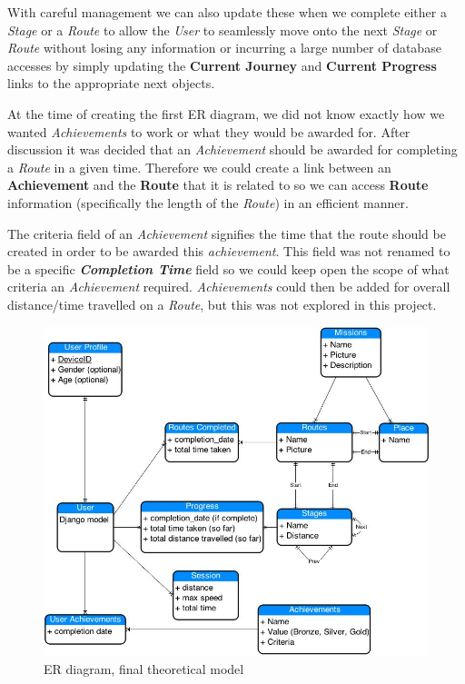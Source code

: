 With careful management we can also update these when we complete
either a \emph{Stage} or a \emph{Route} to allow the \emph{User} to
seamlessly move onto the next \emph{Stage} or \emph{Route} without
losing any information or incurring a large number of database
accesses by simply updating the \textbf{Current Journey} and
\textbf{Current Progress} links to the appropriate next objects. 

At the time of creating the first ER diagram, we did not know exactly
how we wanted \emph{Achievements} to work or what they would be
awarded for. After discussion it was decided that an
\emph{Achievement} should be awarded for completing a \emph{Route} in
a given time. Therefore we could create a link between an
\textbf{Achievement} and the \textbf{Route} that it is related to so
we can access \textbf{Route} information (specifically the length of the 
\emph{Route}) in an efficient manner. 

The criteria field of an \emph{Achievement} signifies the time that
the route should be created in order to be awarded this
\emph{achievement}. This field was not renamed to be a specific
\textbf{\textit{Completion Time}} field so we could keep open the
scope of what criteria an \emph{Achievement}
required. \emph{Achievements} could then be added for overall
distance/time travelled on a \emph{Route}, but this was not explored
in this project.  

\begin{figure}[p]
  \centering
  \includegraphics[width=\textwidth]{images/ER.jpg}
  \caption{ER diagram, final theoretical model}
  \label{ER_1}
\end{figure}

